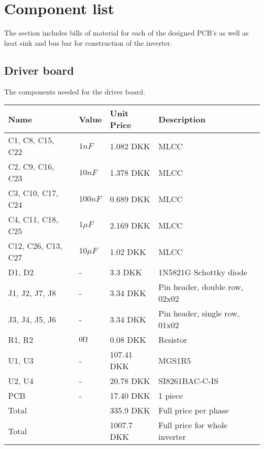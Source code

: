 \section{Component list}
\label{app:component_list}
The section includes bills of material for each of the designed PCB's as well as heat sink and bus bar for construction of the inverter.



\subsection{Driver board}
The components needed for the driver board.
\begin{table}[H]
\centering
\footnotesize
\begin{tabular}{|p{4cm} p{1.5cm} p{2.2cm} p{6cm}|} \hline
\textbf{Name}     & \textbf{Value} & \textbf{Unit Price} & \textbf{Description}  \\ \hline
C1, C8, C15, C22  & $1nF$        & 1.082 DKK   & MLCC \\
C2, C9, C16, C23  & $10nF$       & 1.378 DKK   & MLCC \\
C3, C10, C17, C24 & $100nF$      & 0.689 DKK   & MLCC \\
C4, C11, C18, C25 & $1\mu F$     & 2.169 DKK   & MLCC \\
C12, C26, C13, C27 & $10\mu F$   & 1.02 DKK    & MLCC \\
D1, D2            & -            & 3.3 DKK     & 1N5821G Schottky diode \\
J1, J2, J7, J8    & -            & 3.34 DKK    & Pin header, double row, 02x02 \\
J3, J4, J5, J6    & -            & 3.34 DKK    & Pin header, single row, 01x02 \\
R1, R2            & $0 \ohm$     & 0.08 DKK    & Resistor                             \\
U1, U3            & -            & 107.41 DKK  & MGS1R5                               \\
U2, U4            & -            & 20.78 DKK   & SI8261BAC-C-IS \\       
PCB               & -            & 17.40 DKK   & 1 piece \\ \hline
Total && 335.9 DKK & Full price per phase \\ \hline
Total && 1007.7 DKK & Full price for whole inverter \\ \hline
\end{tabular}
\end{table}


